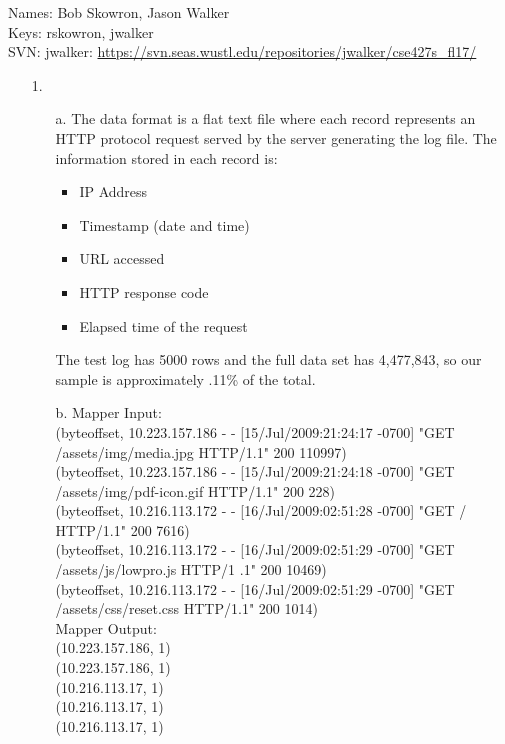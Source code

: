 \documentclass{article}
\begin{document}
\begin{flushleft}
Names: Bob Skowron, Jason Walker\\
Keys: rskowron, jwalker\\
SVN: jwalker: \url{https://svn.seas.wustl.edu/repositories/jwalker/cse427s_fl17/}\\
\end{flushleft}

\begin{itemize}
\item[1.] 
	\begin{itemize}
	\item[a.] The data format is a flat text file where each record represents an HTTP protocol request served by the server generating the log file. The information stored in each record is:\\
		\begin{itemize}
		\item IP Address
		\item Timestamp (date and time)
		\item URL accessed
		\item HTTP response code
		\item Elapsed time of the request
		\end{itemize}
	The test log has 5000 rows and the full data set has 4,477,843, so our sample is approximately .11\% of the total.	
	
	\item[b.] Mapper Input:\\
		(byteoffset, 10.223.157.186 - - [15/Jul/2009:21:24:17 -0700] "GET /assets/img/media.jpg HTTP/1.1" 200 110997)\\
		(byteoffset, 10.223.157.186 - - [15/Jul/2009:21:24:18 -0700] "GET /assets/img/pdf-icon.gif HTTP/1.1" 200 228)\\
		(byteoffset, 10.216.113.172 - - [16/Jul/2009:02:51:28 -0700] "GET / HTTP/1.1" 200 7616)\\
		(byteoffset, 10.216.113.172 - - [16/Jul/2009:02:51:29 -0700] "GET /assets/js/lowpro.js HTTP/1 .1" 200 10469)\\
		(byteoffset, 10.216.113.172 - - [16/Jul/2009:02:51:29 -0700] "GET /assets/css/reset.css HTTP/1.1" 200 1014)\\
		
	Mapper Output:\\
		(10.223.157.186, 1)\\
		(10.223.157.186, 1)\\
		(10.216.113.17, 1)\\
		(10.216.113.17, 1)\\
		(10.216.113.17, 1)\\


\end{itemize}
\end{itemize}
\end{document}
